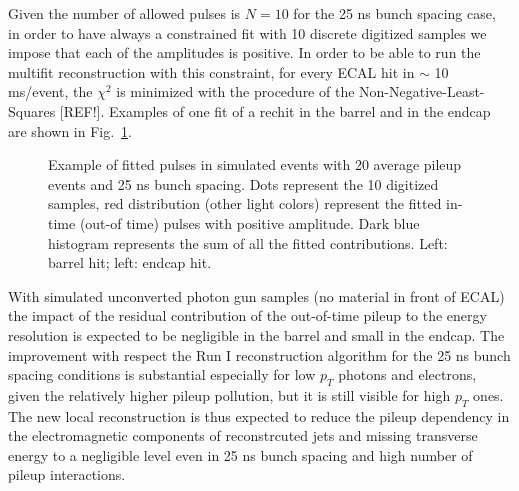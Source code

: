 \documentclass[journal]{IEEEtran}
\begin{document}
%
Given the number of allowed pulses is $N=10$ for the 25 ns bunch spacing case, in order to have always a constrained fit with 10 discrete digitized samples we impose that each of the amplitudes is positive. In order to be able to run the multifit reconstruction with this constraint, for every ECAL hit in $\sim$ 10 ms/event, the $\chi^2$ is minimized with the procedure of the Non-Negative-Least-Squares [REF!]. Examples of one fit of a rechit in the barrel and in the endcap are shown in Fig.~\ref{fig:multifits}.
%
\begin{figure}[!t]
  \begin{center}
    \caption{Example of fitted pulses in simulated events with 20 average pileup events and 25 ns bunch spacing. Dots represent the 10 digitized samples, red distribution (other light colors) represent the fitted in-time (out-of time) pulses with positive amplitude. Dark blue histogram represents the sum of all the fitted contributions. Left: barrel hit; left: endcap hit.  \label{fig:multifits} }
  \end{center}
\end{figure}
%
With simulated unconverted photon gun samples (no material in front of ECAL) the impact of the residual contribution of the out-of-time pileup to the energy resolution is expected to be negligible in the barrel and small in the endcap. The improvement with respect the Run I reconstruction algorithm for the 25 ns bunch spacing conditions is substantial especially for low $p_T$ photons and electrons, given the relatively higher pileup pollution, but it is still visible for high $p_T$ ones. The new local reconstruction is thus expected to reduce the pileup dependency in the electromagnetic components of reconstrcuted jets and missing transverse energy to a negligible level even in 25 ns bunch spacing and high number of pileup interactions.
\end{document}
